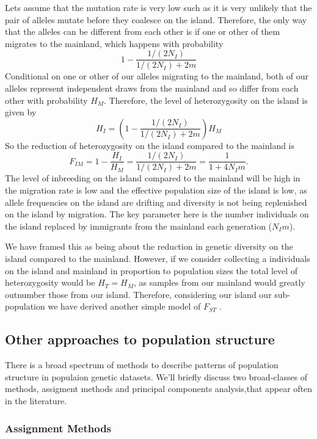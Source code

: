 Lets assume that the mutation rate is very low such as it is very
unlikely that the pair of alleles mutate before they coalesce on the
island. Therefore, the only way that the alleles can be different from
each other is if one or other of them migrates to the mainland, which
happens with probability  
\begin{equation}
1 - \frac{1/(2N_I) }{1/(2N_I) + 2m}
\end{equation}
Conditional on one or other of our alleles migrating to the mainland,
both of our alleles represent independent draws from the mainland and
so differ from each other with probability $H_M$. Therefore, the level of
heterozygosity on the island is given by
\begin{equation}
H_I = (1 - \frac{1/(2N_I) }{1/(2N_I) + 2m})H_M
\end{equation}
So the reduction of heterozygosity on the island compared to the
mainland is
\begin{equation}
F_{IM} = 1- \frac{H_I}{H_M} = \frac{ 1/(2N_I) }{1/(2N_I) + 2m} = \frac{ 1 }{1 + 4N_Im}.
\end{equation}
The level of inbreeding on the island compared to the mainland will
be high in the migration rate is low and the effective population size
of the island is low, as allele frequencies on the island are drifting
and diversity is not being replenished on the island by migration. The
key parameter here is the number individuals on the island replaced by
immigrants from the mainland each generation ($N_I m$).

We have framed this as being about the reduction in genetic diversity on the
island compared to the mainland. However, if we consider collecting a
individuals on the island and mainland in proportion to population
sizes the total level of heterozygosity would be $H_T=H_M$, as samples
from our mainland would greatly outnumber those from our
island. Therefore, considering our island our sub-population we have
derived another simple model of $F_{ST}$ .

\subsection{Other approaches to population structure}
There is a broad spectrum of methods to describe patterns of
population structure in populaion genetic datasets. We'll briefly
discuss two broad-classes of methods, assigment methods and principal
components analysis,that appear often in the literature.

\subsubsection{Assignment Methods}

